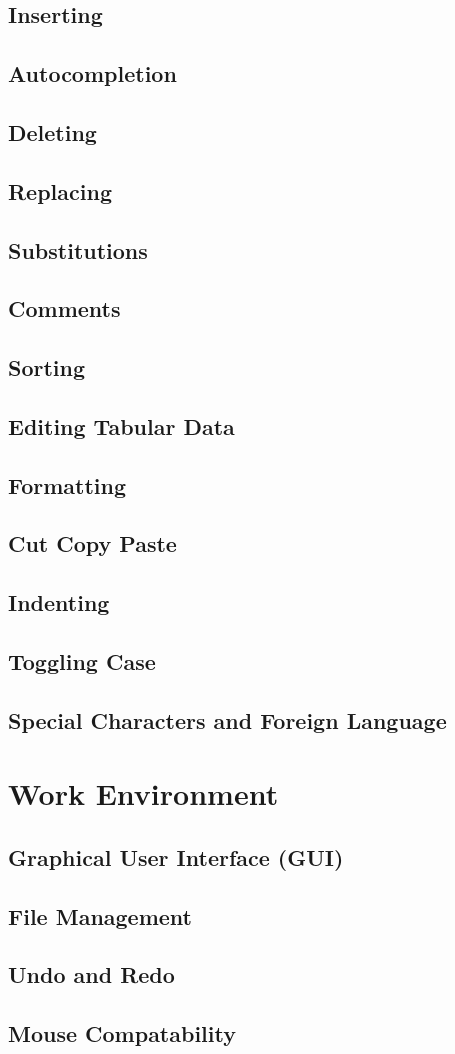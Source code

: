 \documentclass[12pt, oneside]{book}
\begin{document}
  \subsection{Inserting}
  \subsection{Autocompletion}
  \subsection{Deleting}
  \subsection{Replacing}
  \subsection{Substitutions}
  \subsection{Comments}
  \subsection{Sorting}
  \subsection{Editing Tabular Data}
  \subsection{Formatting}
  \subsection{Cut Copy Paste}
  \subsection{Indenting}
  \subsection{Toggling Case}
  \subsection{Special Characters and Foreign Language}
\section{Work Environment}
  \subsection{Graphical User Interface (GUI)}
  \subsection{File Management}
  \subsection{Undo and Redo}
  \subsection{Mouse Compatability}
\end{document}

